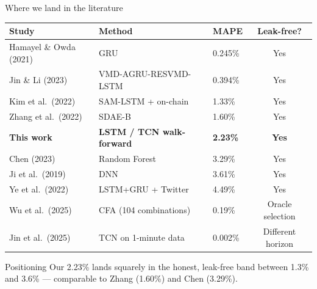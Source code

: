 \documentclass[aspectratio=169]{beamer}
\begin{document}
\begin{frame}{Where we land in the literature}
\footnotesize
\begin{center}
\begin{tabular}{lllc}
\toprule
\textbf{Study} & \textbf{Method} & \textbf{MAPE} & \textbf{Leak-free?} \\
\midrule
Hamayel \& Owda (2021) & GRU & 0.245\% & Yes \\
Jin \& Li (2023)       & VMD-AGRU-RESVMD-LSTM & 0.394\% & Yes \\
Kim et al.\ (2022)     & SAM-LSTM + on-chain  & 1.33\% & Yes \\
Zhang et al.\ (2022)   & SDAE-B               & 1.60\% & Yes \\
\rowcolor{accentgreen!20}
\textbf{This work}     & \textbf{LSTM / TCN walk-forward} & \textbf{2.23\%} & \textbf{Yes} \\
Chen (2023)            & Random Forest        & 3.29\% & Yes \\
Ji et al.\ (2019)      & DNN                  & 3.61\% & Yes \\
Ye et al.\ (2022)      & LSTM+GRU + Twitter   & 4.49\% & Yes \\
\midrule
\rowcolor{accentred!15}
Wu et al.\ (2025)      & CFA (104 combinations)   & 0.19\% & \textcolor{accentred}{Oracle selection} \\
\rowcolor{accentred!15}
Jin et al.\ (2025)     & TCN on 1-minute data     & 0.002\% & \textcolor{accentred}{Different horizon} \\
\bottomrule
\end{tabular}
\end{center}

\vspace{0.2cm}
\begin{block}{Positioning}
Our 2.23\% lands squarely in the honest, leak-free band between 1.3\% and 3.6\% --- comparable to Zhang (1.60\%) and Chen (3.29\%).
\end{block}
\end{frame}
\end{document}
